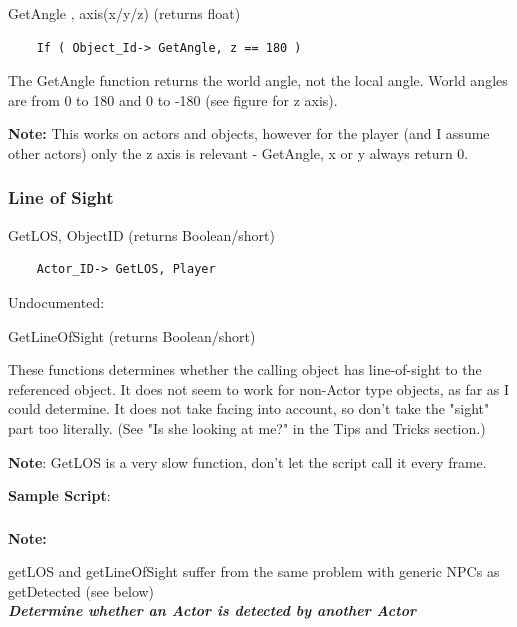 

GetAngle , axis(x/y/z) (returns float)

\begin{lstlisting}
	If ( Object_Id-> GetAngle, z == 180 )
\end{lstlisting}

The GetAngle function returns the world angle, not the local angle.
World angles are from 0 to 180 and 0 to -180 (see figure for z axis).

\textbf{Note:} This works on actors and objects, however for the player
(and I assume other actors) only the z axis is relevant - GetAngle, x or
y always return 0.


\hypertarget{line-of-sight}{%
\subsubsection{Line of Sight}\label{line-of-sight}}

GetLOS, ObjectID (returns Boolean/short)

\begin{lstlisting}
	Actor_ID-> GetLOS, Player
\end{lstlisting}

Undocumented:

GetLineOfSight (returns Boolean/short)

These functions determines whether the calling object has line-of-sight
to the referenced object. It does not seem to work for non-Actor type
objects, as far as I could determine. It does not take facing into
account, so don't take the "sight" part too literally. (See "Is she
looking at me?" in the Tips and Tricks section.)

\textbf{Note}: GetLOS is a very slow function, don't let the script call
it every frame.

\textbf{Sample Script}:



\hypertarget{section-2}{%
\subsubsection{}\label{section-2}}

\textbf{Note:}

getLOS and getLineOfSight suffer from the same problem with generic NPCs
as getDetected (see below)\\
\protect\hypertarget{_Toc182634542}{}{}\emph{\textbf{Determine whether
an Actor is detected by another Actor}}

